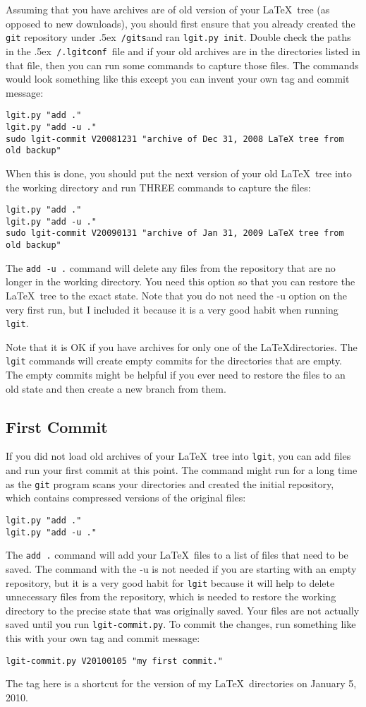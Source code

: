 \documentclass{ltxdoc}
\def\bobtilde{\lower.5ex\hbox{\tt \string~}}%
\def\ucmd#1{{\tt {#1}}}
\def\lgitconf{\bobtilde\ucmd{/.lgitconf}}
\def\mygits{\bobtilde\ucmd{/gits}}
\begin{document}
Assuming that you have archives are of old version of your \LaTeX\ tree (as opposed to new downloads), you should first ensure that you already created the \ucmd{git} repository under \mygits and ran \ucmd{lgit.py init}. Double check the paths in the \lgitconf\ file and if your old archives are in the directories listed in that file, then you can run some commands to capture those files.  The commands would look something like this except you can invent your own tag and commit message:
\begin{verbatim}
lgit.py "add ."
lgit.py "add -u ."
sudo lgit-commit V20081231 "archive of Dec 31, 2008 LaTeX tree from old backup"
\end{verbatim} 
When this is done, you should put the next version of your old \LaTeX\ tree into the working directory and run THREE commands to capture the files:
\begin{verbatim}
lgit.py "add ."
lgit.py "add -u ."
sudo lgit-commit V20090131 "archive of Jan 31, 2009 LaTeX tree from old backup"
\end{verbatim} 
The \ucmd{add -u .} command will delete any files from the repository that are no longer in the working directory.  You need this option so that you can restore the \LaTeX\ tree to the exact state.  Note that you do not need the -u option on the very first run, but I included it because it is a very good habit when running \ucmd{lgit}.

Note that it is OK if you have archives for only one of the \LaTeX directories.  The \ucmd{lgit} commands will create empty commits for the directories that are empty.  The empty commits might be helpful if you ever need to restore the files to an old state and then create a new branch from them.

\subsection{First Commit}
If you did not load old archives of your \LaTeX\ tree into \ucmd{lgit}, you can add files and run your first commit at this point.  The command might run for a long time as the \ucmd{git} program scans your directories and created the initial repository, which contains compressed versions of the original files:
\begin{verbatim}
lgit.py "add ."
lgit.py "add -u ."
\end{verbatim}
The \ucmd{add .} command will add your \LaTeX\ files to a list of files that need to be saved.  The command with the -u is not needed if you are starting with an empty repository, but it is a very good habit for \ucmd{lgit} because it will help to delete unnecessary files from the repository, which is needed to restore the working directory to the precise state that was originally saved.  Your files are not actually saved until you run \ucmd{lgit-commit.py}. To commit the changes, run something like this with your own tag and commit message:
\begin{verbatim}
lgit-commit.py V20100105 "my first commit."
\end{verbatim}
The tag here is a shortcut for the version of my \LaTeX\ directories on January 5, 2010.
\end{document}
